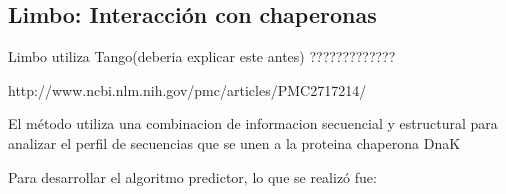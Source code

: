   
  
  
  

\subsection{Limbo: Interacción con chaperonas}

Limbo utiliza Tango(deberia explicar este antes) ?????????????

http://www.ncbi.nlm.nih.gov/pmc/articles/PMC2717214/



El método utiliza una combinacion de informacion secuencial y estructural para analizar el perfil de secuencias que se unen a la proteina chaperona DnaK

Para desarrollar el algoritmo predictor, lo que se realizó fue:

